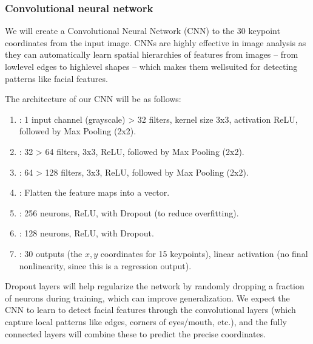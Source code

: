 \documentclass[letterpaper,10pt,english]{jupyterBook}
\begin{document}
\subsubsection{Convolutional neural network}
\label{\detokenize{04:convolutional-neural-network}}
\sphinxAtStartPar
We will create a Convolutional Neural Network (CNN) to  the 30 keypoint coordinates from the input image. CNNs are highly effective in image analysis as they can automatically learn spatial hierarchies of features from images – from low\sphinxhyphen{}level edges to high\sphinxhyphen{}level shapes – which makes them well\sphinxhyphen{}suited for detecting patterns like facial features.

\sphinxAtStartPar
The architecture of our CNN will be as follows:
\begin{enumerate}
%
\item {} 
\sphinxAtStartPar
{}: 1 input channel (grayscale) \sphinxhyphen{}> 32 filters, kernel size 3x3, activation ReLU, followed by Max Pooling (2x2).

\item {} 
\sphinxAtStartPar
{}: 32 \sphinxhyphen{}> 64 filters, 3x3, ReLU, followed by Max Pooling (2x2).

\item {} 
\sphinxAtStartPar
{}: 64 \sphinxhyphen{}> 128 filters, 3x3, ReLU, followed by Max Pooling (2x2).

\item {} 
\sphinxAtStartPar
{}: Flatten the feature maps into a vector.

\item {} 
\sphinxAtStartPar
{}: 256 neurons, ReLU, with Dropout (to reduce overfitting).

\item {} 
\sphinxAtStartPar
{}: 128 neurons, ReLU, with Dropout.

\item {} 
\sphinxAtStartPar
{}: 30 outputs (the \( x,y \) coordinates for 15 keypoints), linear activation (no final nonlinearity, since this is a regression output).

\end{enumerate}

\sphinxAtStartPar
Dropout layers will help regularize the network by randomly dropping a fraction of neurons during training, which can improve generalization. We expect the CNN to learn to detect facial features through the convolutional layers (which capture local patterns like edges, corners of eyes/mouth, etc.), and the fully connected layers will combine these to predict the precise coordinates.
\end{document}

